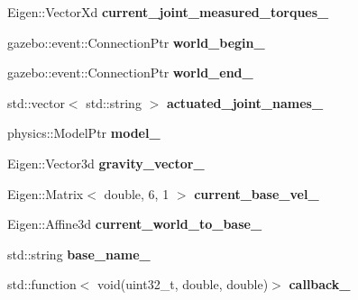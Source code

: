 \begin{DoxyCompactItemize}
Eigen\+::\+Vector\+Xd {\bfseries current\+\_\+joint\+\_\+measured\+\_\+torques\+\_\+}
\item 
\mbox{\label{classgazebo_1_1_panda_simulation_ae2ff65eb458903adeb3a94e6b3135211}} 
gazebo\+::event\+::\+Connection\+Ptr {\bfseries world\+\_\+begin\+\_\+}
\item 
\mbox{\label{classgazebo_1_1_panda_simulation_a0392f81c0a1af939a801b0144a37339b}} 
gazebo\+::event\+::\+Connection\+Ptr {\bfseries world\+\_\+end\+\_\+}
\item 
\mbox{\label{classgazebo_1_1_panda_simulation_a5cf10e5600f5ee5cfec74f78d757a453}} 
std\+::vector$<$ std\+::string $>$ {\bfseries actuated\+\_\+joint\+\_\+names\+\_\+}
\item 
\mbox{\label{classgazebo_1_1_panda_simulation_ad25690d987147052b2d0c1ea20a06646}} 
physics\+::\+Model\+Ptr {\bfseries model\+\_\+}
\item 
\mbox{\label{classgazebo_1_1_panda_simulation_ace15eb1ae41c098028571966144053a5}} 
Eigen\+::\+Vector3d {\bfseries gravity\+\_\+vector\+\_\+}
\item 
\mbox{\label{classgazebo_1_1_panda_simulation_aa167df29f8a9c183c84e3d29cfc52b13}} 
Eigen\+::\+Matrix$<$ double, 6, 1 $>$ {\bfseries current\+\_\+base\+\_\+vel\+\_\+}
\item 
\mbox{\label{classgazebo_1_1_panda_simulation_a70f1bd58bf3285e80d7c9e1344e26980}} 
Eigen\+::\+Affine3d {\bfseries current\+\_\+world\+\_\+to\+\_\+base\+\_\+}
\item 
\mbox{\label{classgazebo_1_1_panda_simulation_acd5c9922b7dc10e96900954d3e5888b2}} 
std\+::string {\bfseries base\+\_\+name\+\_\+}
\item 
\mbox{\label{classgazebo_1_1_panda_simulation_a3c2c1305ac89b2033976946505894254}} 
std\+::function$<$ void(uint32\+\_\+t, double, double)$>$ {\bfseries callback\+\_\+}
\item 

\end{DoxyCompactItemize}
